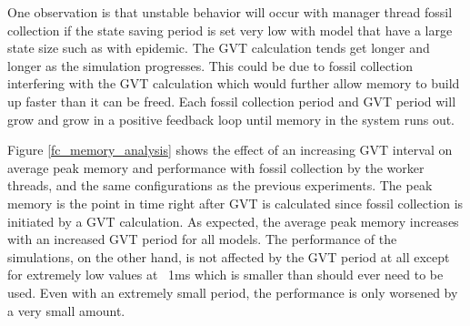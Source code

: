 \documentclass[11pt]{book}
\begin{document}
One observation is that unstable behavior will occur with manager thread fossil collection
if the state saving period is set very low with model that have a large state size such as with
epidemic. The GVT calculation tends get longer and longer as the simulation progresses. This could
be due to fossil collection interfering with the GVT calculation which would further allow memory
to build up faster than it can be freed. Each fossil collection period and GVT period will grow
and grow in a positive feedback loop until memory in the system runs out.

Figure \ref{fc_memory_analysis} shows the effect of an increasing GVT interval on average peak
memory and performance with fossil collection by the worker threads, and the same configurations
as the previous experiments. The peak memory is the point in time right after GVT is calculated
since fossil collection is initiated by a GVT calculation. As expected, the average peak memory
increases with an increased GVT period for all models. The performance of the simulations, on
the other hand, is not affected by the GVT period at all except for extremely low values at ~1ms
which is smaller than should ever need to be used. Even with an extremely small period, the
performance is only worsened by a very small amount.
\end{document}
